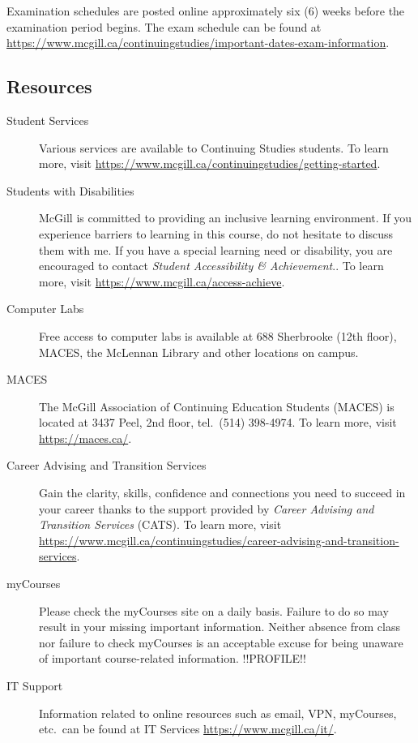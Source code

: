 \documentclass{article}
\begin{document}
Examination schedules are posted online approximately six (6) weeks
before the examination period begins. The exam schedule can be found
at
\url{https://www.mcgill.ca/continuingstudies/important-dates-exam-information}.

\newpage

\subsection{Resources }

\begin{description}
\item[Student Services]{Various services are available to Continuing
  Studies students. To learn more, visit \url{https://www.mcgill.ca/continuingstudies/getting-started}.}
\item[Students with Disabilities]{McGill is committed to providing an
  inclusive learning environment. If you experience barriers to
  learning in this course, do not hesitate to discuss them with me. If
  you have a special learning need or disability, you are encouraged
  to contact {\em Student Accessibility \& Achievement}.. To learn more,
  visit \url{https://www.mcgill.ca/access-achieve}.}
 \item[Computer Labs]{Free access to computer labs is available at 688
   Sherbrooke (12th floor), MACES, the McLennan Library and other
   locations on campus.}
 \item[MACES]{The McGill Association of Continuing Education Students
   (MACES) is located at 3437 Peel, 2nd floor, tel.\ (514) 398-4974. To
   learn more, visit \url{https://maces.ca/}.}
\item[Career Advising and Transition Services]{Gain the clarity,
  skills, confidence and connections you need to succeed in your
  career thanks to the support provided by {\em Career Advising and
    Transition Services} (CATS). To learn more, visit
  \url{https://www.mcgill.ca/continuingstudies/career-advising-and-transition-services}.}
\item[myCourses]{Please check the myCourses site on a daily
  basis. Failure to do so may result in your missing important
  information. Neither absence from class nor failure to check
  myCourses is an acceptable excuse for being unaware of important
  course-related information.}
!!PROFILE!!
\item[IT Support]{Information related to online resources such as
  email, VPN, myCourses, etc.\ can be found at IT Services
  \url{https://www.mcgill.ca/it/}.}
\end{description}

\label{LastPage}
\end{document}
